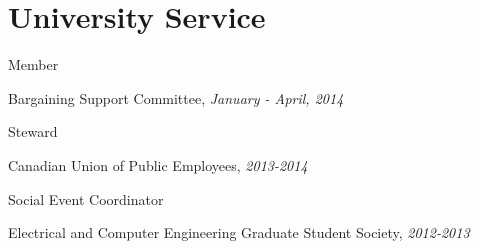 \section{\sc University Service}

Member
\begin{list1}
\item[] Bargaining Support Committee, \textit{January - April, 2014}
\end{list1}

Steward
\begin{list1}
\item[] Canadian Union of Public Employees, \textit{2013-2014}
\end{list1}

Social Event Coordinator
\begin{list1}
\item[] Electrical and Computer Engineering Graduate Student Society, \textit{2012-2013}
\end{list1}